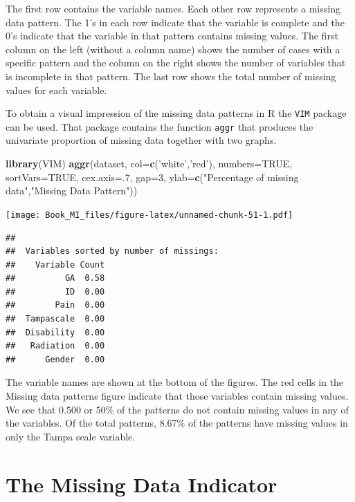 \documentclass[
]{book}
\newenvironment{Shaded}{\begin{snugshade}}{\end{snugshade}}
\newcommand{\DataTypeTok}[1]{\textcolor[rgb]{0.13,0.29,0.53}{#1}}
\newcommand{\DecValTok}[1]{\textcolor[rgb]{0.00,0.00,0.81}{#1}}
\newcommand{\KeywordTok}[1]{\textcolor[rgb]{0.13,0.29,0.53}{\textbf{#1}}}
\newcommand{\NormalTok}[1]{#1}
\newcommand{\OtherTok}[1]{\textcolor[rgb]{0.56,0.35,0.01}{#1}}
\newcommand{\StringTok}[1]{\textcolor[rgb]{0.31,0.60,0.02}{#1}}
\begin{document}
The first row contains the variable names. Each other row represents a missing data pattern. The 1's in each row indicate that the variable is complete and the 0's indicate that the variable in that pattern contains missing values. The first column on the left (without a column name) shows the number of cases with a specific pattern and the column on the right shows the number of variables that is incomplete in that pattern. The last row shows the total number of missing values for each variable.

To obtain a visual impression of the missing data patterns in R the \texttt{VIM} package can be used. That package contains the function \texttt{aggr} that produces the univariate proportion of missing data together with two graphs.

\begin{Shaded}
\begin{Highlighting}[]
\KeywordTok{library}\NormalTok{(VIM)}
\KeywordTok{aggr}\NormalTok{(dataset, }\DataTypeTok{col=}\KeywordTok{c}\NormalTok{(}\StringTok{'white'}\NormalTok{,}\StringTok{'red'}\NormalTok{), }\DataTypeTok{numbers=}\OtherTok{TRUE}\NormalTok{, }\DataTypeTok{sortVars=}\OtherTok{TRUE}\NormalTok{, }\DataTypeTok{cex.axis=}\NormalTok{.}\DecValTok{7}\NormalTok{, }\DataTypeTok{gap=}\DecValTok{3}\NormalTok{, }\DataTypeTok{ylab=}\KeywordTok{c}\NormalTok{(}\StringTok{"Percentage of missing data"}\NormalTok{,}\StringTok{"Missing Data Pattern"}\NormalTok{))}
\end{Highlighting}
\end{Shaded}

\texttt{[image: Book\_MI\_files/figure-latex/unnamed-chunk-51-1.pdf]}

\begin{verbatim}
## 
##  Variables sorted by number of missings: 
##    Variable Count
##          GA  0.58
##          ID  0.00
##        Pain  0.00
##  Tampascale  0.00
##  Disability  0.00
##   Radiation  0.00
##      Gender  0.00
\end{verbatim}

The variable names are shown at the bottom of the figures. The red cells in the Missing data patterns figure indicate that those variables contain missing values. We see that 0.500 or 50\% of the patterns do not contain missing values in any of the variables. Of the total patterns, 8.67\% of the patterns have missing values in only the Tampa scale variable.

\hypertarget{the-missing-data-indicator}{%
\section{The Missing Data Indicator}\label{the-missing-data-indicator}}
\end{document}
